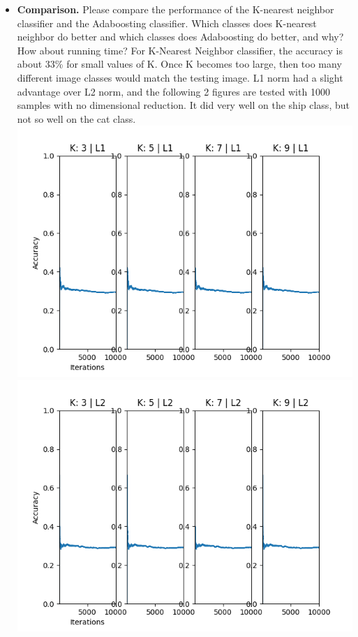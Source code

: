 \documentclass[11pt]{article}
\begin{document}
    \begin{itemize}
        \item \textbf{Comparison.} Please compare the performance of the K-nearest neighbor classifier and the
        Adaboosting classifier. Which classes does K-nearest neighbor do better and which classes does Adaboosting do
        better, and
        why? How about running time?\newline
        For K-Nearest Neighbor classifier, the accuracy is about 33\% for small values of K. Once K becomes too
        large, then too many different image classes would match the testing image. L1 norm had a slight advantage
        over L2 norm, and the following 2 figures are tested with 1000 samples with no dimensional reduction.
        It did very well on the ship class, but not so well on the cat class.
        \includegraphics[width=\textwidth]{Output Pictures/Nearest Neighbors L1}
        \includegraphics[width=\textwidth]{Output Pictures/Nearest Neighbors L2}

\end{itemize}
\end{document}
